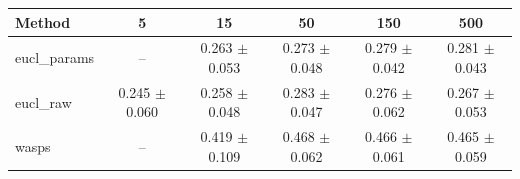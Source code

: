 \begin{table}[htbp]
\centering
\begin{NiceTabular}{lccccc}
\toprule
Method & 5 & 15 & 50 & 150 & 500 \\
\midrule
eucl\_params & -- & 0.263 $\pm$ 0.053 & 0.273 $\pm$ 0.048 & 0.279 $\pm$ 0.042 & 0.281 $\pm$ 0.043 \\
eucl\_raw & 0.245 $\pm$ 0.060 & 0.258 $\pm$ 0.048 & 0.283 $\pm$ 0.047 & 0.276 $\pm$ 0.062 & 0.267 $\pm$ 0.053 \\
wasps & -- & 0.419 $\pm$ 0.109 & 0.468 $\pm$ 0.062 & 0.466 $\pm$ 0.061 & 0.465 $\pm$ 0.059 \\
\bottomrule
\end{NiceTabular}
\label{tab:sens_river_n_samples_barycenter}
\end{table}
